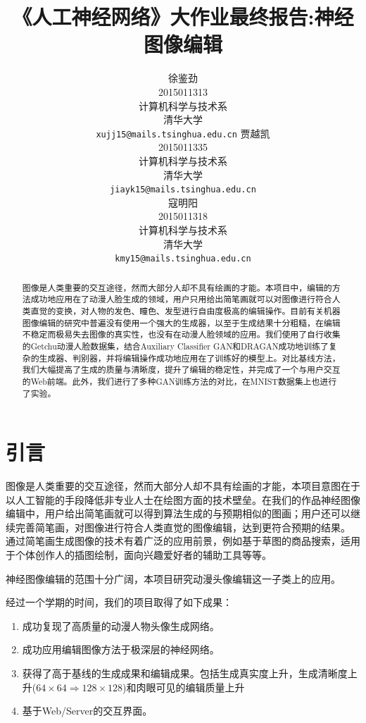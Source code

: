 \documentclass[a4paper,12pt,UTF8]{ctexart}
\title{《人工神经网络》大作业最终报告:神经图像编辑}
\author{
  徐鉴劲 \\
  2015011313 \\
  计算机科学与技术系 \\
  清华大学 \\
  \texttt{xujj15@mails.tsinghua.edu.cn}
  \AND
  贾越凯 \\
  2015011335 \\
  计算机科学与技术系 \\
  清华大学 \\
  \texttt{jiayk15@mails.tsinghua.edu.cn} \\
  \AND
  寇明阳 \\
  2015011318 \\
  计算机科学与技术系 \\
  清华大学 \\
  \texttt{kmy15@mails.tsinghua.edu.cn} \\
}
\begin{document}
\maketitle

\begin{abstract}

图像是人类重要的交互途径，然而大部分人却不具有绘画的才能。本项目中，编辑的方法成功地应用在了动漫人脸生成的领域，用户只用给出简笔画就可以对图像进行符合人类直觉的变换，对人物的发色、瞳色、发型进行自由度极高的编辑操作。目前有关机器图像编辑的研究中普遍没有使用一个强大的生成器，以至于生成结果十分粗糙，在编辑不稳定而极易失去图像的真实性，也没有在动漫人脸领域的应用。我们使用了自行收集的Getchu动漫人脸数据集，结合Auxiliary Classifier GAN和DRAGAN成功地训练了复杂的生成器、判别器，并将编辑操作成功地应用在了训练好的模型上。对比基线方法，我们大幅提高了生成的质量与清晰度，提升了编辑的稳定性，并完成了一个与用户交互的Web前端。此外，我们进行了多种GAN训练方法的对比，在MNIST数据集上也进行了实验。

\end{abstract}


\section{引言}

图像是人类重要的交互途径，然而大部分人却不具有绘画的才能，本项目意图在于以人工智能的手段降低非专业人士在绘图方面的技术壁垒。在我们的作品神经图像编辑中，用户给出简笔画就可以得到算法生成的与预期相似的图画；用户还可以继续完善简笔画，对图像进行符合人类直觉的图像编辑，达到更符合预期的结果。
通过简笔画生成图像的技术有着广泛的应用前景，例如基于草图的商品搜索，适用于个体创作人的插图绘制，面向兴趣爱好者的辅助工具等等。

神经图像编辑的范围十分广阔，本项目研究动漫头像编辑这一子类上的应用。

经过一个学期的时间，我们的项目取得了如下成果：

\begin{enumerate}
\item 成功复现了高质量的动漫人物头像生成网络。
\item 成功应用编辑图像方法于极深层的神经网络。
\item 获得了高于基线的生成成果和编辑成果。包括生成真实度上升，生成清晰度上升($64 \times 64 \Rightarrow 128 \times 128$)和肉眼可见的编辑质量上升
\item 基于Web/Server的交互界面。
\end{enumerate}
\end{document}
